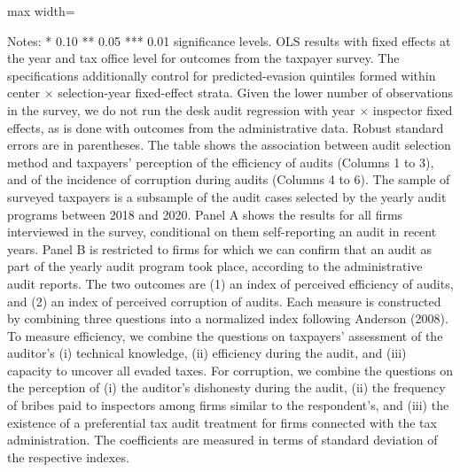 \documentclass{article}
\begin{document}
\begin{table}[H]
\begin{adjustbox}{max width=\textwidth}
\begin{threeparttable}
\begin{tablenotes}[flushleft]
\footnotesize
\item Notes: * 0.10 ** 0.05 *** 0.01 significance levels. OLS results with fixed effects at the year and tax office level for outcomes from the taxpayer survey. The specifications additionally control for predicted-evasion quintiles formed within center $\times$ selection-year fixed-effect strata. Given the lower number of observations in the survey, we do not run the desk audit regression with year $\times$ inspector fixed effects, as is done with outcomes from the administrative data. Robust standard errors are in parentheses. The table shows the association between audit selection method and taxpayers' perception of the efficiency of audits (Columns 1 to 3), and of the incidence of corruption during audits (Columns 4 to 6). The sample of surveyed taxpayers is a subsample of the audit cases selected by the yearly audit programs between 2018 and 2020. Panel A shows the results for all firms interviewed in the survey, conditional on them self-reporting an audit in recent years. Panel B is restricted to firms for which we can confirm that an audit as part of the yearly audit program took place, according to the administrative audit reports. The two outcomes are (1) an index of perceived efficiency of audits, and (2) an index of perceived corruption of audits. Each measure is constructed by combining three questions into a normalized index following Anderson (2008). To measure efficiency, we combine the questions on taxpayers' assessment of the auditor's (i) technical knowledge, (ii) efficiency during the audit, and (iii) capacity to uncover all evaded taxes. For corruption, we combine the questions on the perception of (i) the auditor's dishonesty during the audit, (ii) the frequency of bribes paid to inspectors among firms similar to the respondent's, and (iii) the existence of a preferential tax audit treatment for firms connected with the tax administration. The coefficients are measured in terms of standard deviation of the respective indexes.
\end{tablenotes}
\end{threeparttable}
\end{adjustbox}
\end{table}
\end{document}
